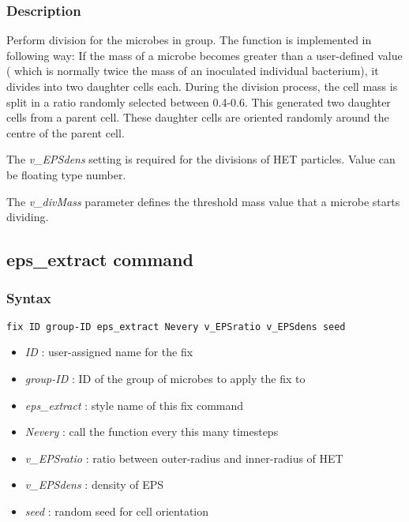 \documentclass[11pt,a4paper,openright]{article}
\begin{document}
\subsubsection*{Description}

Perform division for the microbes in group. 
The function is implemented in following way: If the mass of a microbe becomes greater than 
a user-defined value (
which is normally twice the mass of an inoculated individual bacterium), 
it divides into two daughter cells each. During the division process,
the cell mass is split in a ratio randomly selected between 0.4-0.6. This
generated two daughter cells from a parent cell. These daughter cells are
oriented randomly around the centre of the parent cell.

The {\it v\_EPSdens} setting is required for the divisions of HET
particles. Value can be floating type number.

The {\it v\_divMass} parameter defines the threshold mass value that a microbe starts dividing.

\newpage
\subsection{eps\_extract command}
\label{epsextract}
\subsubsection*{Syntax}

\begin{Verbatim}[frame=single]
fix ID group-ID eps_extract Nevery v_EPSratio v_EPSdens seed
\end{Verbatim}

\begin{itemize}  [nosep]
\item
	{\it ID }: user-assigned name for the fix
\item
	{\it group-ID }: ID of the group of microbes to apply the fix to
\item
	{\it eps\_extract }: style name of this fix command
\item
	{\it Nevery }: call the function every this many timesteps
\item
	{\it v\_EPSratio }: ratio between outer-radius and inner-radius of HET
\item
	{\it v\_EPSdens }: density of EPS 
\item 
	{\it seed }: random seed for cell orientation
\end{itemize}
\end{document}
